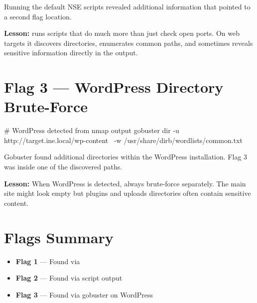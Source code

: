 \begin{takebox}

Running the default NSE scripts revealed additional information that pointed to
a second flag location.


\begin{takebox}
\textbf{Lesson:}  runs scripts that do much more than just check open
ports. On web targets it discovers directories, enumerates common paths, and
sometimes reveals sensitive information directly in the output.
\end{takebox}

\section*{Flag 3 --- WordPress Directory Brute-Force}

\begin{termbox}
# WordPress detected from nmap output
gobuster dir -u http://target.ine.local/wp-content \
  -w /usr/share/dirb/wordlists/common.txt
\end{termbox}

Gobuster found additional directories within the WordPress installation. Flag 3
was inside one of the discovered paths.


\begin{takebox}
\textbf{Lesson:} When WordPress is detected, always brute-force 
separately. The main site might look empty but plugins and uploads directories
often contain sensitive content.
\end{takebox}

\section*{Flags Summary}

\begin{checkbox}
\begin{itemize}
  \item[$\checkmark$] \textbf{Flag 1} --- Found via 
  \item[$\checkmark$] \textbf{Flag 2} --- Found via \ic{nmap -sC} script output
  \item[$\checkmark$] \textbf{Flag 3} --- Found via gobuster on WordPress
        \ic{/wp-content/}
\end{itemize}
\end{checkbox}


\end{takebox}
